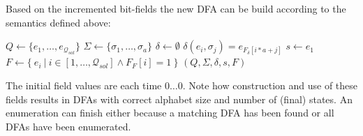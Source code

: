 Based on the incremented bit-fields the new DFA can be build according to the semantics defined above:
\vspace{0.2cm}
\begin{algorithmic}[1]
	\State $Q \gets \{e_1, \ldots, e_{\mathcal{Q}_{sol}}\}$
	\State $\Sigma \gets \{\sigma_1, \ldots, \sigma_a\}$
	\State $\delta \gets \emptyset$
            \State $\delta(e_i, \sigma_j) = e_{F_\delta[i * a + j]}$
		\EndFor
	\EndFor
	\State $s \gets e_1$
	\State $F \gets \{\ e_i\ |\ i \in [1, \ldots, \mathcal{Q}_{sol}] \land F_F[i] = 1\ \}$
	\State \Return $(Q, \Sigma, \delta, s, F)$
	\EndFunction
\end{algorithmic}
\vspace{0.2cm}
The initial field values are each time $0\ldots 0$. Note how construction and use of these fields results in DFAs with correct alphabet size and number of (final) states. An enumeration can finish either because a matching DFA has been found or all DFAs have been enumerated.


